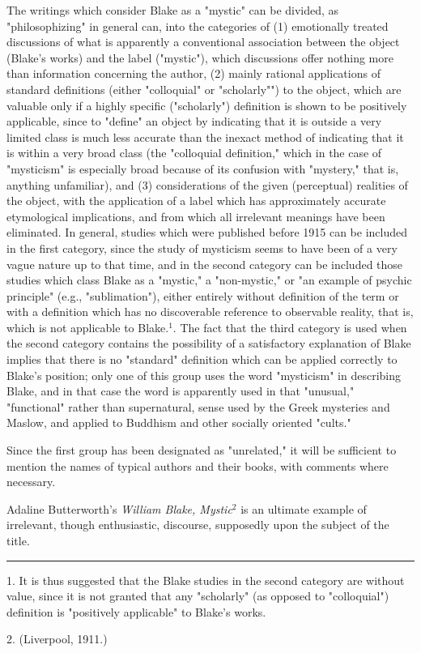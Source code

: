The writings which consider Blake as a "mystic" can be
divided, as "philosophizing" in general can, into the categories of (1)
emotionally treated discussions of what is
apparently a conventional association between the object 
(Blake's works) and the label ("mystic"), which discussions
offer nothing more than information concerning the author,
(2) mainly rational applications of standard definitions
(either "colloquial" or "scholarly"") to the object, which
are valuable only if a highly specific ("scholarly") definition
is shown to be positively applicable, since to "define" an
object by indicating that it is outside a very limited
class is much less accurate than the inexact method of
indicating that it is within a very broad class (the
"colloquial definition," which in the case of "mysticism" is
especially broad because of its confusion with "mystery," that
is, anything unfamiliar), and (3) considerations of the 
given (perceptual) realities of the object, with the application
of a label which has approximately accurate etymological
implications, and from which all irrelevant meanings have 
been eliminated. In general, studies which were published
before 1915 can be included in the first category, since the
study of mysticism seems to have been of a very vague nature
up to that time, and in the second category can be included 
those studies which class Blake as a "mystic," a "non-mystic,"
or "an example of psychic principle" (e.g., "sublimation"),
either entirely without definition of the term or with a 
definition which has no discoverable reference to observable
reality, that is, which is not applicable to Blake.$^{1}$. The 
fact that the third category is used when the second category 
contains the possibility of a satisfactory explanation of Blake
implies that there is no "standard" definition which
can be applied correctly to Blake's position; only one of this
group uses the word "mysticism" in describing Blake, and in
that case the word is apparently used in that "unusual,"
"functional" rather than supernatural, sense used by the Greek
mysteries and Maslow, and applied to Buddhism and other
socially oriented "cults."\par
\vspace{0.5\baselineskip}
Since the first group has been designated as "unrelated,"
it will be sufficient to mention the names of typical authors
and their books, with comments where necessary.\par
\vspace{0.5\baselineskip}
Adaline Butterworth's \textit{William Blake, Mystic}$^{2}$ is an
ultimate example of irrelevant, though enthusiastic, discourse, supposedly
upon the subject of the title.\par
\vspace*{\fill}
\noindent\rule{0.25\textwidth}{0.4pt}\par
1. It is thus suggested that the Blake studies in the 
second category are without value, since it is not
granted that any "scholarly" (as opposed to "colloquial")
definition is "positively applicable" to Blake's works.\par
2. (Liverpool, 1911.)\par

